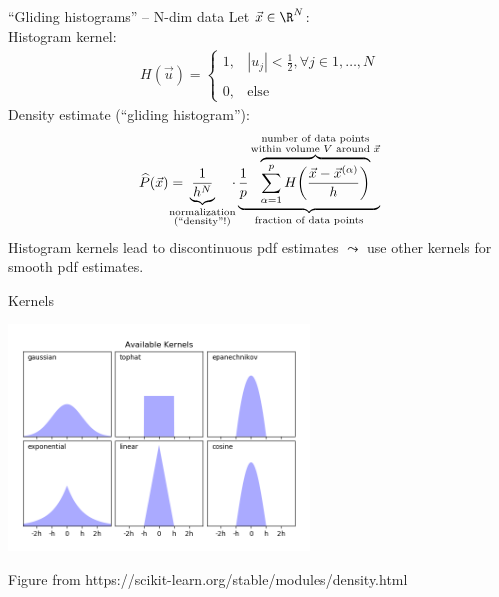\begin{frame}[t]{``Gliding histograms'' -- N-dim data}
\small
Let $\vec x \in \R^N$:\\
Histogram kernel:
\begin{equation*}
\begin{array}{ll}
H(\vec{u}) = \left \{ \begin{array}{ll}
1, & |u_j| < \frac{1}{2}, \forall j \in 1, \ldots, N \\\\
0, & \text{else}
\end{array} \right.
\end{array}
\end{equation*}
Density estimate (``gliding histogram''):
\vspace{-0.3cm}
\begin{equation*}
	\widehat{P}(\vec{x}) = \kern-3ex \underbrace{ \frac{1}{h^N} }_{
	\substack{ \text{normalization} \\
		\text{(``density''!)}}}
		\kern-1ex
\cdot \underbrace{ \frac{1}{p} 
	\overbrace{ \sum\limits_{\alpha = 1}^p
		H \bigg( \frac{\vec{x} - \vec{x}^{(\alpha)}}{
			h} \bigg) }^{
		\substack{\text{number of data points}\\
			\text{within volume } V 
			\text{ around } \vec{x}}} }_{
	\text{fraction of data points}}
\end{equation*}
Histogram kernels lead to discontinuous pdf estimates $\leadsto$ use other kernels for smooth pdf estimates. 
\end{frame}

\begin{frame}{Kernels}

\begin{center}	
	\includegraphics[width=0.6\textwidth]{./img/sphx_glr_plot_kde_1d_0021}
\end{center}

{\footnotesize
Figure from https://scikit-learn.org/stable/modules/density.html
}


\end{frame}

